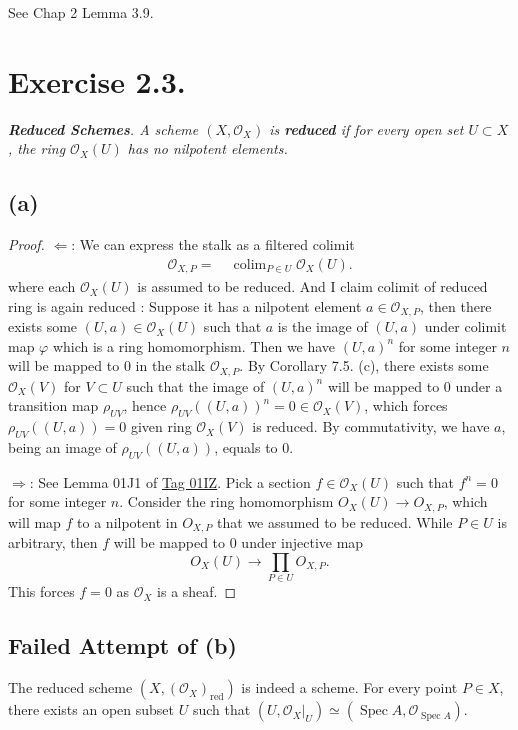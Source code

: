 See \cite{qing2006algebraic} Chap 2 Lemma 3.9.

\section{Exercise 2.3.}
\textit{\textbf{Reduced Schemes}. A scheme $(X,\mathcal O_X)$ is \textbf{reduced} if for every open set $U\subset X$, the ring $\mathcal O_X(U)$ has no nilpotent elements.}

\subsection{(a)}

\begin{proof}
    $\Leftarrow$:
    We can express the stalk as a filtered colimit 
    \begin{align*}
        \mathcal O_{X,P}
        =&~ \operatorname{colim}_{P\in U}\mathcal O_X(U).
    \end{align*} where each $\mathcal O_X(U)$ is assumed to be reduced. 
    And I claim colimit of reduced ring is again reduced :
    Suppose it has a nilpotent element $a\in\mathcal O_{X,P}$, then there exists some $(U,a)\in \mathcal O_X(U)$ such that $a$ is the image of $(U,a)$ under colimit map $\varphi$ which is a ring homomorphism. Then we have $(U,a)^n$ for some integer $n$ will be mapped to $0$ in the stalk $\mathcal O_{X,P}$. By \cite{altman2013term} Corollary 7.5. (c), there exists some $\mathcal O_X(V)$ for $V\subset U$ such that the image of $(U,a)^n$ will be mapped to $0$ under a transition map $\rho_{UV}$, hence $\rho_{UV}((U,a))^n=0\in\mathcal O_X(V)$, which forces $\rho_{UV}((U,a))=0$ given ring $\mathcal O_X(V)$ is reduced. By commutativity, we have $a$, being an image of $\rho_{UV}((U,a))$, equals to $0$. 

    $\Rightarrow$: 
    See Lemma 01J1 of \href{https://stacks.math.columbia.edu/tag/01IZ}{Tag 01IZ}. 
    Pick a section $f\in\mathcal O_X(U)$ such that $f^n=0$ for some integer $n$. 
    Consider the ring homomorphism $O_X(U)\to O_{X,P}$, which will map $f$ to a nilpotent in $O_{X,P}$ that we assumed to be reduced. While $P\in U$ is arbitrary, then $f$ will be mapped to $0$ under injective map 
    \[O_X(U)\to \prod_{P\in U}O_{X,P}.\] This forces $f=0$ as $\mathcal O_X$ is a sheaf.
\end{proof} 

\subsection{Failed Attempt of (b)}
The reduced scheme $(X,(\mathcal O_X)_{\text{red}})$ is indeed a scheme. For every point $P\in X$, there exists an open subset $U$ such that $(U,\mathcal O_X\vert_U)\simeq (\operatorname{Spec}A,\mathcal O_{\operatorname{Spec}A})$.

